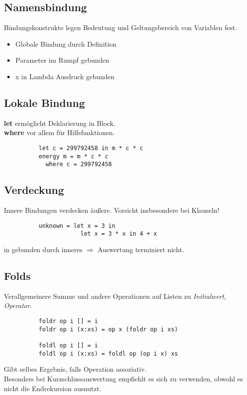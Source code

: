 \subsection{Namensbindung}%
\label{hsk:sub:namensbindung}
Bindungskonstrukte legen Bedeutung und Geltungsbereich von Variablen fest.
\begin{itemize}
  \item Globale Bindung durch Definition
  \item Parameter im Rumpf gebunden
  \item x in Lambda Ausdruck gebunden
\end{itemize}

\subsection{Lokale Bindung}%
\label{hsk:sub:lokale-bindung}
\textbf{let} ermöglicht Deklarierung in Block.\\
\textbf{where} vor allem für Hilfsfunktionen.
\begin{lstlisting}
          let c = 299792458 in m * c * c
          energy m = m * c * c
            where c = 299792458
\end{lstlisting}

\subsection{Verdeckung}%
\label{hsk:sub:verdeckung}
Innere Bindungen verdecken äußere.
Vorsicht insbesondere bei  Klauseln!
\begin{lstlisting}
          unknown = let x = 3 in
                      let x = 3 * x in 4 + x
\end{lstlisting}
 in  gebunden durch inneres 
\(\Rightarrow\) Auswertung terminiert nicht.

\subsection{Folds}%
\label{hsk:sub:folds}
Verallgemeinere Summe und andere Operationen auf Listen zu \textit{Initialwert, Operator}.
\begin{lstlisting}
          foldr op i [] = i
          foldr op i (x:xs) = op x (foldr op i xs)

          foldl op i [] = i
          foldl op i (x:xs) = foldl op (op i x) xs
\end{lstlisting}
Gibt selbes Ergebnis, falls Operation assoziativ.\\
Besonders bei Kurzschlussauswertung empfiehlt es sich  zu verwenden, obwohl es nicht die Endrekursion ausnutzt.

